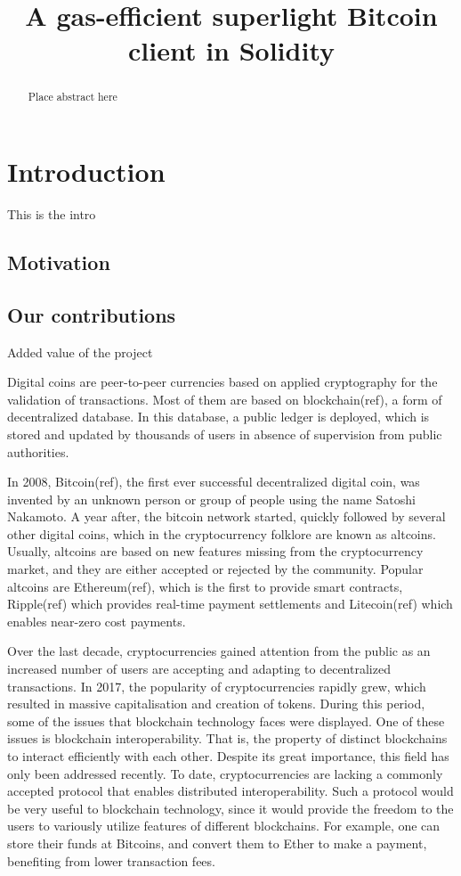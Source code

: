 \documentclass{article}
\title{A gas-efficient superlight Bitcoin client in Solidity}
\begin{document}
\maketitle

\begin{abstract}
Place abstract here
\end{abstract}

\section{Introduction}
This is the intro
\subsection{Motivation}
\subsection{Our contributions}
Added value of the project

Digital coins are peer-to-peer currencies based on applied cryptography for the
validation of transactions. Most of them are based on blockchain(ref), a form
of decentralized database. In this database, a public ledger is deployed, which
is stored and updated by thousands of users in absence of supervision from
public authorities.

In 2008, Bitcoin(ref), the first ever successful decentralized digital coin,
was invented by an unknown person or group of people using the name Satoshi
Nakamoto. A year after, the bitcoin network started, quickly followed by
several other digital coins, which in the cryptocurrency folklore are known as
altcoins. Usually, altcoins are based on new features missing from the
cryptocurrency market, and they are either accepted or rejected by the
community. Popular altcoins are Ethereum(ref), which is the first to provide
smart contracts, Ripple(ref) which provides real-time payment settlements and
Litecoin(ref) which enables near-zero cost payments.

Over the last decade, cryptocurrencies gained attention from the public as an
increased number of users are accepting and adapting to decentralized
transactions. In 2017, the popularity of cryptocurrencies rapidly grew, which
resulted in massive capitalisation and creation of tokens. During this period,
some of the issues that blockchain technology faces were displayed. One of
these issues is blockchain interoperability. That is, the property of
distinct blockchains to interact efficiently with each other. Despite its great
importance, this field has only been addressed recently. To date,
cryptocurrencies are lacking a commonly accepted protocol that enables
distributed interoperability. Such a protocol would be very useful to
blockchain technology, since it would provide the freedom to the users to
variously utilize features of different blockchains. For example, one can store
their funds at Bitcoins, and convert them to Ether to make a payment,
benefiting from lower transaction fees.
\end{document}
